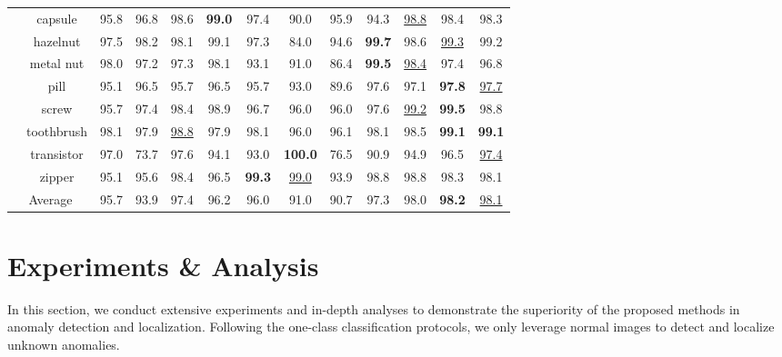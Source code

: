 \documentclass[default,iicol]{sn-jnl}\usepackage[algo2e,ruled,linesnumbered]{algorithm2e}
\theoremstyle{thmstyleone}\newtheorem{theorem}{Theorem}\newtheorem{proposition}[theorem]{Proposition}
\theoremstyle{thmstyletwo}\newtheorem{example}{Example}\newtheorem{remark}{Remark}
\theoremstyle{thmstylethree}\newtheorem{definition}{Definition}
\begin{document}
\begin{table*}[!t]
\begin{tabular}{c|c|ccccccccc|cc}
    &capsule                                          
        &95.8  &96.8     &98.6       &\textbf{99.0}      &97.4      &90.0      &95.9      &94.3      &\underline{98.8}      &98.4 &98.3\\
    &hazelnut                                          
        &97.5  &98.2     &98.1       &99.1      &97.3      &84.0      &94.6      &\textbf{99.7}      &98.6      &\underline{99.3} &99.2\\
    &metal nut                                        
        &98.0  &97.2     &97.3       &98.1      &93.1      &91.0      &86.4      &\textbf{99.5}      &\underline{98.4}      &97.4 &96.8\\
    &pill                                            
        &95.1  &96.5     &95.7       &96.5      &95.7      &93.0      &89.6      &97.6      &97.1      &\textbf{97.8} &\underline{97.7}\\
    &screw                                           
        &95.7  &97.4     &98.4       &98.9     &96.7      &96.0      &96.0      &97.6      &\underline{99.2}      &\textbf{99.5} &98.8\\
    &toothbrush                                       
        &98.1  &97.9     &\underline{98.8}       &97.9      &98.1      &96.0      &96.1      &98.1      &98.5      &\textbf{99.1} &\textbf{99.1}\\
    &transistor                                       
        &97.0  &73.7     &97.6       &94.1      &93.0      &\textbf{100.0}     &76.5      &90.9      &94.9      &96.5 &\underline{97.4}\\
    &zipper                                          
        &95.1  &95.6     &98.4       &96.5      &\textbf{99.3}      &\underline{99.0}      &93.9      &98.8      &98.8      &98.3 &98.1\\
        \hline      
    \multicolumn{2}{c|}{Average}                          
        &95.7  &93.9     &97.4       &96.2      &96.0      &91.0      &90.7      &97.3      &98.0      &\textbf{98.2} &\underline{98.1}\\\hline
    \end{tabular}
    \label{table:PAL}
\end{table*}


\section{Experiments \& Analysis}
In this section, we conduct extensive experiments and in-depth analyses to demonstrate the superiority of the proposed methods in anomaly detection and localization.
Following the one-class classification protocols, we only leverage normal images to detect and localize unknown anomalies.
\end{document}
